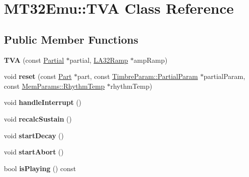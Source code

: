 \hypertarget{classMT32Emu_1_1TVA}{\section{M\-T32\-Emu\-:\-:T\-V\-A Class Reference}
\label{classMT32Emu_1_1TVA}
}
\subsection*{Public Member Functions}
\begin{DoxyCompactItemize}
\item 
\hypertarget{classMT32Emu_1_1TVA_a86dce683f35d06c8713d9bb5e9cde160}{{\bfseries T\-V\-A} (const \hyperlink{classMT32Emu_1_1Partial}{Partial} $\ast$partial, \hyperlink{classMT32Emu_1_1LA32Ramp}{L\-A32\-Ramp} $\ast$amp\-Ramp)}\label{classMT32Emu_1_1TVA_a86dce683f35d06c8713d9bb5e9cde160}

\item 
\hypertarget{classMT32Emu_1_1TVA_a615a5d6d693035f241587257298566ab}{void {\bfseries reset} (const \hyperlink{classMT32Emu_1_1Part}{Part} $\ast$part, const \hyperlink{structMT32Emu_1_1TimbreParam_1_1PartialParam}{Timbre\-Param\-::\-Partial\-Param} $\ast$partial\-Param, const \hyperlink{structMT32Emu_1_1MemParams_1_1RhythmTemp}{Mem\-Params\-::\-Rhythm\-Temp} $\ast$rhythm\-Temp)}\label{classMT32Emu_1_1TVA_a615a5d6d693035f241587257298566ab}

\item 
\hypertarget{classMT32Emu_1_1TVA_a43aadcdec12c477472206698da20b73b}{void {\bfseries handle\-Interrupt} ()}\label{classMT32Emu_1_1TVA_a43aadcdec12c477472206698da20b73b}

\item 
\hypertarget{classMT32Emu_1_1TVA_a882afffe8cd1962dc5780c3a8e9e6f90}{void {\bfseries recalc\-Sustain} ()}\label{classMT32Emu_1_1TVA_a882afffe8cd1962dc5780c3a8e9e6f90}

\item 
\hypertarget{classMT32Emu_1_1TVA_adeca59bbd23c5895071e1b9ed8b5adfd}{void {\bfseries start\-Decay} ()}\label{classMT32Emu_1_1TVA_adeca59bbd23c5895071e1b9ed8b5adfd}

\item 
\hypertarget{classMT32Emu_1_1TVA_a57b87f68c0afa488392c7e6835dcc845}{void {\bfseries start\-Abort} ()}\label{classMT32Emu_1_1TVA_a57b87f68c0afa488392c7e6835dcc845}

\item 
\hypertarget{classMT32Emu_1_1TVA_a07824c2ce5bbe74bc13e2ed488c82939}{bool {\bfseries is\-Playing} () const }\label{classMT32Emu_1_1TVA_a07824c2ce5bbe74bc13e2ed488c82939}


\end{DoxyCompactItemize}
